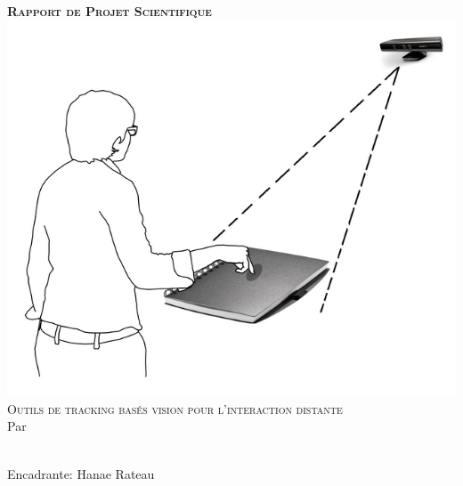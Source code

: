 \makeatletter
\begin{titlepage}
\centering
\vspace{-10em}
{\LARGE \textbf{\textsc{Rapport de Projet Scientifique}}}\\
\vspace{3em}
\includegraphics[scale=0.45]{image/resultmod.png}\\
\vspace{3em}
{\LARGE \textsc{Outils de tracking basés vision pour l’interaction distante}}\\

\vspace{8em}
Par\\
\vspace{1em}
{\LARGE \@author}\\

\vspace{2em}

\flushleft Encadrante: Hanae Rateau


\end{titlepage}
\makeatother

\sloppy